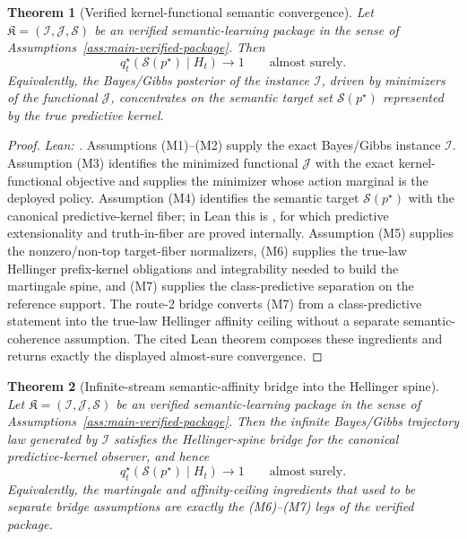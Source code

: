 \documentclass[11pt]{article}
\newtheorem{theorem}{Theorem}[section]
\theoremstyle{definition}
\theoremstyle{remark}
\theoremstyle{plain}
\theoremstyle{definition}
\newcommand{\Scal}{\mathcal{S}}
\begin{document}
\begin{theorem}[Verified kernel-functional semantic convergence]
\label{thm:separating-support-convergence}
Let $\mathfrak K=(\mathcal I,\mathcal J,\Scal)$ be an verified semantic-learning package in the sense of Assumptions~\ref{ass:main-verified-package}. Then
\[
q_t^\star(\Scal(p^\star)\mid H_t)\longrightarrow 1
\qquad
\text{almost surely.}
\]
Equivalently, the Bayes/Gibbs posterior of the instance $\mathcal I$, driven by minimizers of the functional $\mathcal J$, concentrates on the semantic target set $\Scal(p^\star)$ represented by the true predictive kernel.
\end{theorem}

\begin{proof}
\noindent\emph{Lean: .}
Assumptions \textup{(M1)--(M2)} supply the exact Bayes/Gibbs instance $\mathcal I$. Assumption \textup{(M3)} identifies the minimized functional $\mathcal J$ with the exact kernel-functional objective and supplies the minimizer whose action marginal is the deployed policy. Assumption \textup{(M4)} identifies the semantic target $\Scal(p^\star)$ with the canonical predictive-kernel fiber; in Lean this is , for which predictive extensionality and truth-in-fiber are proved internally. Assumption \textup{(M5)} supplies the nonzero/non-top target-fiber normalizers, \textup{(M6)} supplies the true-law Hellinger prefix-kernel obligations and integrability needed to build the martingale spine, and \textup{(M7)} supplies the class-predictive separation on the reference support. The route-2 bridge converts \textup{(M7)} from a class-predictive statement into the true-law Hellinger affinity ceiling without a separate semantic-coherence assumption. The cited Lean theorem composes these ingredients and returns exactly the displayed almost-sure convergence.
\end{proof}

\begin{theorem}[Infinite-stream semantic-affinity bridge into the Hellinger spine]
\label{thm:infinite-affinity-hellinger-bridge}
Let $\mathfrak K=(\mathcal I,\mathcal J,\Scal)$ be an verified semantic-learning package in the sense of Assumptions~\ref{ass:main-verified-package}. Then the infinite Bayes/Gibbs trajectory law generated by $\mathcal I$ satisfies the Hellinger-spine bridge for the canonical predictive-kernel observer, and hence
\[
q_t^\star(\Scal(p^\star)\mid H_t)\longrightarrow 1
\qquad
\text{almost surely.}
\]
Equivalently, the martingale and affinity-ceiling ingredients that used to be separate bridge assumptions are exactly the \textup{(M6)}--\textup{(M7)} legs of the verified package.
\end{theorem}
\end{document}
